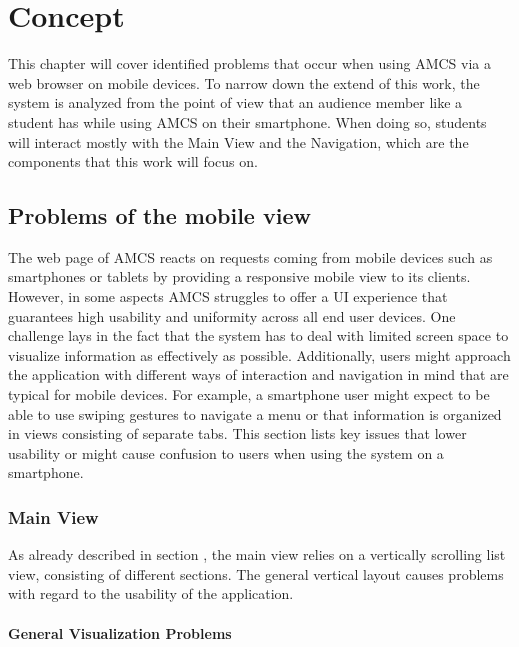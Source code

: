 \chapter{Concept}
This chapter will cover identified problems that occur when using AMCS via a web browser on mobile
devices. To narrow down the extend of this work, the system is analyzed from the point of view that an audience member like a student has while using AMCS on their smartphone. When doing so, students will interact mostly with the Main View and the Navigation, which are the components that this work will focus on.

\section{Problems of the mobile view}

The web page of AMCS reacts on requests coming from mobile devices such as smartphones or tablets by providing a responsive mobile view to its clients. However, in some aspects AMCS struggles to offer a UI experience that guarantees high usability and uniformity across all end user devices.
One challenge lays in the fact that the system has to deal with limited screen space to visualize information as effectively as possible. Additionally, users might approach the application with different ways of interaction and navigation in mind that are typical for mobile devices. For example, a smartphone user might expect to be able to use swiping gestures to navigate a menu or that information is organized in views consisting of separate tabs. This section lists key issues that lower usability or might cause confusion to users when using the system on a smartphone.

\subsection{Main View}
As already described in section \todosct, the main view relies on a vertically scrolling list view, consisting of different sections. The general vertical layout causes problems with regard to the usability of the application.

\subsubsection{General Visualization Problems}

